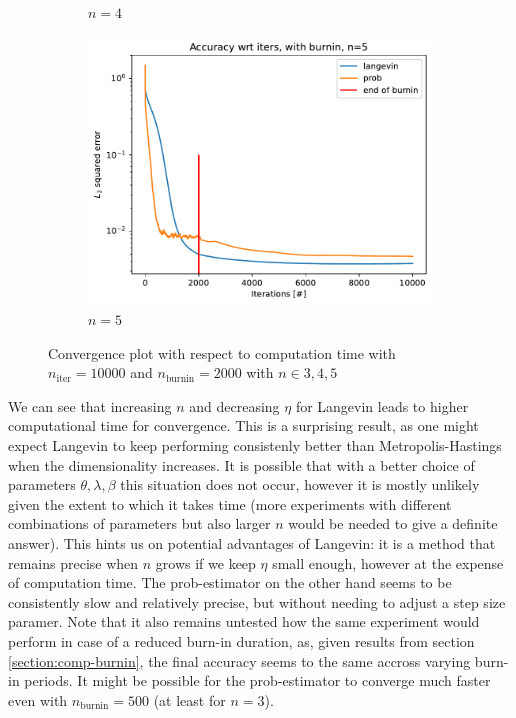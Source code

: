 \documentclass[12pt]{memoir}
\newcommand{\nitern}[1]{$n_{\text{iter}}=#1$}
\newcommand{\nburninn}[1]{$n_{\text{burnin}}=#1$}
\begin{document}
\begin{figure}[H]
\begin{subfigure}[b]{0.49\textwidth}
        \caption{$n=4$}
        \label{fig:conv-plot-time-diff-n-4-sub}
    \end{subfigure}
    \begin{subfigure}[b]{0.49\textwidth}
        \centering
        \includegraphics[width=\textwidth]{figures/experiments/baseline/diff_n_qubits/iters_acc_comp_iters_no_avg_n5-1.png}
        \caption{$n=5$}
        \label{fig:conv-plot-time-diff-n-5-sub}
    \end{subfigure}
    \caption{Convergence plot with respect to computation time with \nitern{10000} and \nburninn{2000} with $n\in{3,4,5}$}
    \label{fig:conv-plot-time-diff-n}
\end{figure}

We can see that increasing $n$ and decreasing $\eta$ for Langevin leads to higher computational time for convergence. This is a surprising result, as one might expect Langevin to keep performing consistenly better than Metropolis-Hastings when the dimensionality increases. It is possible that with a better choice of parameters $\theta, \lambda,\beta$ this situation does not occur, however it is mostly unlikely given the extent to which it takes time (more experiments with different combinations of parameters but also larger $n$ would be needed to give a definite answer). This hints us on potential advantages of Langevin: it is a method that remains precise when $n$ grows if we keep $\eta$ small enough, however at the expense of computation time. The prob-estimator on the other hand seems to be consistently slow and relatively precise, but without needing to adjust a step size paramer. Note that it also remains untested how the same experiment would perform in case of a reduced burn-in duration, as, given results from section \ref{section:comp-burnin}, the final accuracy seems to the same accross varying burn-in periods. It might be possible for the prob-estimator to converge much faster even with \nburninn{500} (at least for $n=3$).\medbreak
\end{document}
